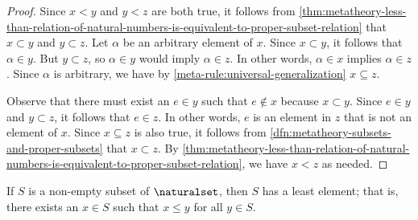 \begin{proof}
    Since \( x < y \) and \( y < z \) are both true, it follows from \cref{thm:metatheory-less-than-relation-of-natural-numbers-is-equivalent-to-proper-subset-relation}
    that \( x \subset y \) and \( y \subset z \).
    Let \( \alpha \) be an arbitrary element of \( x \).
    Since \( x \subset y \), it follows that \( \alpha \in y \).
    But \( y \subset z \), so \( \alpha \in y \) would imply \( \alpha \in z \).
    In other words, \( \alpha \in x \) implies \( \alpha \in z \).
    Since \( \alpha \) is arbitrary, we have by \cref{meta-rule:universal-generalization} \( x \subseteq z \).
    
    \vspace{0.3cm}
    \noindent
    Observe that there must exist an \( e \in y \) such that \( e \notin x \) because \( x \subset y \). Since \( e \in y \) and \( y \subset z \),
    it follows that \( e \in z \). In other words, \( e \) is an element in \( z \) that is not an element of \( x \).
    Since \( x \subseteq z \) is also true, it follows from \cref{dfn:metatheory-subsets-and-proper-subsets} that \( x \subset z \).
    By \cref{thm:metatheory-less-than-relation-of-natural-numbers-is-equivalent-to-proper-subset-relation}, we have \( x < z \) as needed.
\end{proof}

\begin{thm}
     \label{thm:metatheory-well-ordering-of-natural-numbers}
    If \( S \) is a non-empty subset of \( \naturalset \), then \( S \) has a least element; that is,
    there exists an \( x \in S \) such that \( x \leq y \) for all \( y \in S \).
\end{thm}


